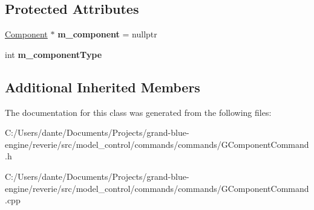 \subsection*{Protected Attributes}
\begin{DoxyCompactItemize}
\item 
\mbox{\label{classrev_1_1_add_scene_object_component_a80fc1d2329e5db3a2961d61bd4d3f4ba}} 
\mbox{\hyperlink{classrev_1_1_component}{Component}} $\ast$ {\bfseries m\+\_\+component} = nullptr
\item 
\mbox{\label{classrev_1_1_add_scene_object_component_aa2502ad40c581d9d85c6b184732d68de}} 
int {\bfseries m\+\_\+component\+Type}
\end{DoxyCompactItemize}
\subsection*{Additional Inherited Members}


The documentation for this class was generated from the following files\+:\begin{DoxyCompactItemize}
\item 
C\+:/\+Users/dante/\+Documents/\+Projects/grand-\/blue-\/engine/reverie/src/model\+\_\+control/commands/commands/G\+Component\+Command.\+h\item 
C\+:/\+Users/dante/\+Documents/\+Projects/grand-\/blue-\/engine/reverie/src/model\+\_\+control/commands/commands/G\+Component\+Command.\+cpp\end{DoxyCompactItemize}
